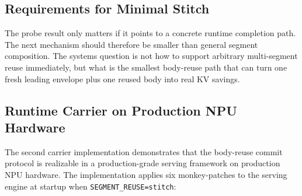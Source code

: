 \documentclass[conference]{IEEEtran}
\begin{document}
\subsection{Requirements for Minimal Stitch}

The probe result only matters if it points to a concrete runtime completion path. The next mechanism should therefore be smaller than general segment composition. The systems question is not how to support arbitrary multi-segment reuse immediately, but what is the smallest body-reuse path that can turn one fresh leading envelope plus one reused body into real KV savings.

\subsection{Runtime Carrier on Production NPU Hardware}
\label{sec:impl-vllm}

The second carrier implementation demonstrates that the body-reuse commit protocol is realizable in a production-grade serving framework on production NPU hardware. The implementation applies six monkey-patches to the serving engine at startup when \texttt{SEGMENT\_REUSE=stitch}:
\end{document}
